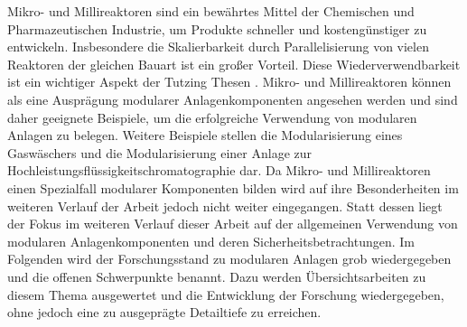 Mikro- und Millireaktoren sind ein bew\"ahrtes Mittel der Chemischen und Pharmazeutischen Industrie, um Produkte schneller und kosteng\"unstiger zu entwickeln. Insbesondere die Skalierbarkeit durch Parallelisierung von vielen Reaktoren der gleichen Bauart ist ein gro\ss{}er Vorteil. Diese Wiederverwendbarkeit ist ein wichtiger Aspekt der Tutzing Thesen \cite{Processnet_2009}. Mikro- und Millireaktoren k\"onnen als eine Auspr\"agung modularer Anlagenkomponenten angesehen werden und sind daher geeignete Beispiele, um die erfolgreiche Verwendung von modularen Anlagen zu belegen. Weitere Beispiele stellen die Modularisierung eines  Gasw\"aschers \cite{Ohle_2014} und die Modularisierung einer Anlage zur Hochleistungsfl\"ussigkeitschromatographie \cite{Rottke_2012} dar. \newline
Da Mikro- und Millireaktoren einen Spezialfall modularer Komponenten bilden wird auf ihre Besonderheiten im weiteren Verlauf der Arbeit jedoch nicht weiter eingegangen. Statt dessen liegt der Fokus im weiteren Verlauf dieser Arbeit auf der allgemeinen Verwendung von modularen Anlagenkomponenten und deren Sicherheitsbetrachtungen. \newline
Im Folgenden wird der Forschungsstand zu modularen Anlagen grob wiedergegeben und die offenen Schwerpunkte benannt. Dazu werden \"Ubersichtsarbeiten zu diesem Thema ausgewertet und die Entwicklung der Forschung wiedergegeben, ohne jedoch eine zu ausgepr\"agte Detailtiefe zu erreichen.  

